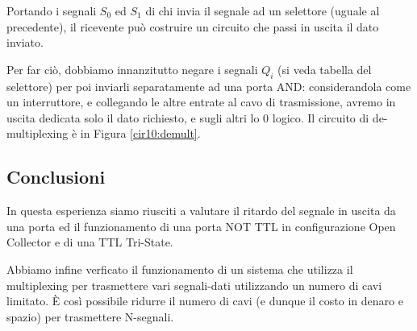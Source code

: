 Portando i segnali $S_0$ ed $S_1$ di chi invia il segnale ad un selettore (uguale al precedente), il ricevente può costruire un circuito che passi in uscita il dato inviato.

Per far ciò, dobbiamo innanzitutto negare i segnali $Q_i$ (si veda tabella del selettore) per poi inviarli separatamente ad una porta AND: considerandola come un interruttore, e collegando le altre entrate al cavo di trasmissione, avremo in uscita dedicata solo il dato richiesto, e sugli altri lo 0 logico.
Il circuito di de-multiplexing è in Figura \ref{cir10:demult}.


\subsection*{Conclusioni}

In questa esperienza siamo riusciti a valutare il ritardo del segnale in uscita da una porta ed il funzionamento di una porta NOT TTL in configurazione Open Collector e di una TTL Tri-State.

Abbiamo infine verficato il funzionamento di un sistema che utilizza il multiplexing per trasmettere vari segnali-dati utilizzando un numero di cavi limitato. È così possibile ridurre il numero di cavi (e dunque il costo in denaro e spazio) per trasmettere N-segnali.

